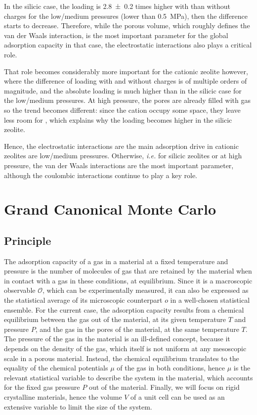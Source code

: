\documentclass[main.tex]{subfiles}
\begin{document}
In the silicic case, the loading is \num{2.8\pm0.2} times higher with than without charges for the low/medium pressures (lower than \qty{0.5}{MPa}), then the difference starts to decrease. Therefore, while the porous volume, which roughly defines the van der Waals interaction, is the most important parameter for the global adsorption capacity in that case, the electrostatic interactions also plays a critical role.

That role becomes considerably more important for the cationic zeolite however, where the difference of loading with and without charges is of multiple orders of magnitude, and the absolute loading is much higher than in the silicic case for the low/medium pressures. At high pressure, the pores are already filled with gas so the trend becomes different: since the cation occupy some space, they leave less room for , which explains why the loading becomes higher in the silicic zeolite.

Hence, the electrostatic interactions are the main adsorption drive in cationic zeolites are low/medium pressures. Otherwise, \textit{i.e.} for silicic zeolites or at high pressure, the van der Waals interactions are the most important parameter, although the coulombic interactions continue to play a key role.


\section{Grand Canonical Monte Carlo}
\label{GCMC}

\subsection{Principle}

The adsorption capacity of a gas in a material at a fixed temperature and pressure is the number of molecules of gas that are retained by the material when in contact with a gas in these conditions, at equilibrium. Since it is a macroscopic observable $\mathcal O$, which can be experimentally measured, it can also be expressed as the statistical average of its microscopic counterpart $o$ in a well-chosen statistical ensemble. For the current case, the adsorption capacity results from a chemical equilibrium between the gas out of the material, at its given temperature $T$ and pressure $P$, and the gas in the pores of the material, at the same temperature $T$. The pressure of the gas in the material is an ill-defined concept, because it depends on the density of the gas, which itself is not uniform at any mesoscopic scale in a porous material. Instead, the chemical equilibrium translates to the equality of the chemical potentials $\mu$ of the gas in both conditions, hence $\mu$ is the relevant statistical variable to describe the system in the material, which accounts for the fixed gas pressure $P$ out of the material. Finally, we will focus on rigid crystalline materials, hence the volume $V$ of a unit cell can be used as an extensive variable to limit the size of the system.
\end{document}
